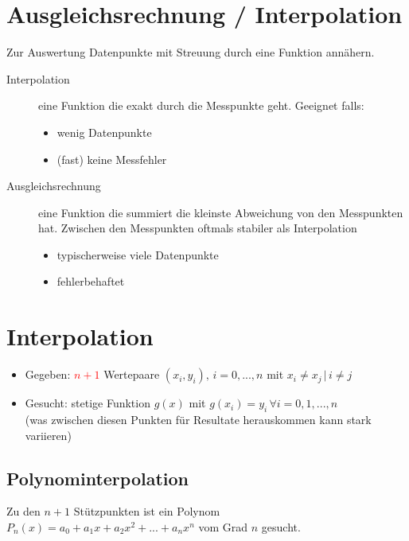 \section{Ausgleichsrechnung / Interpolation}

Zur Auswertung Datenpunkte mit Streuung durch eine Funktion annähern.

\begin{description}
    \item[Interpolation] eine Funktion die exakt durch die Messpunkte geht.
        Geeignet falls:
        \begin{itemize}
            \item wenig Datenpunkte
            \item (fast) keine Messfehler
        \end{itemize}
    \item[Ausgleichsrechnung] eine Funktion die summiert die kleinste Abweichung
        von den Messpunkten hat. Zwischen den Messpunkten oftmals stabiler
        als Interpolation
        \begin{itemize}
            \item typischerweise viele Datenpunkte
            \item fehlerbehaftet
        \end{itemize}
\end{description}

\section{Interpolation}

\begin{itemize}
    \item Gegeben: \textcolor{red}{$n+1$} Wertepaare $(x_i, y_i), \, i = 0,...,n$ 
        mit $x_i \ne x_j \, | \, i \ne j$
    \item Gesucht: stetige Funktion $g(x)$ mit $g(x_i) = y_i \, \forall i = 0,1,...,n$ \\
        (was zwischen diesen Punkten für Resultate herauskommen kann stark variieren)
\end{itemize}


\subsection{Polynominterpolation}

Zu den $n+1$ Stützpunkten ist ein Polynom $P_n(x) 
    = a_0 + a_1 x + a_2 x^2 + ... + a_n x^n$ vom Grad $n$ gesucht.

